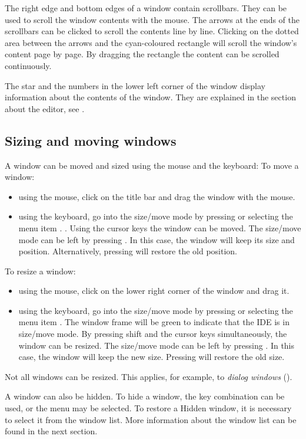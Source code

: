 The right edge and bottom edges of a window contain scrollbars.
They can be used to scroll the window contents with the mouse. 
The arrows at the ends of the scrollbars can be clicked to scroll the 
contents line by line. Clicking on the dotted area between the arrows 
and the cyan-coloured rectangle will scroll the window's content 
page by page. By dragging the rectangle the content can be scrolled 
continuously.

The star and the numbers in the lower left corner of the window
display information about the contents of the window. They
are explained in the section about the editor, see .

%
%
\subsection{Sizing and moving windows}
\label{se:windowsizingmoving}
A window can be moved and sized using the mouse and the keyboard:
To move a window:
\begin{itemize}
\item using the mouse, click on the title bar and drag the window 
with the mouse.
\item using the keyboard, go into the size/move mode
by pressing  or selecting the menu item
. . Using the cursor keys the window can be moved. 
The size/move mode can be left by pressing . 
In this case, the window will keep its size and position. 
Alternatively, pressing  will restore the old position.
\end{itemize} 
To resize a window:
\begin{itemize}
\item using the mouse, click on the lower right corner of the window
and drag it.
\item using the keyboard, go into the size/move mode
by pressing  or selecting the menu item
. The window frame will be green to indicate that
the IDE is in size/move mode. 
By pressing shift and the cursor keys simultaneously, the window can 
be resized.  The size/move mode can be left by pressing
. In this case, the window will keep the new size.
Pressing  will restore the old size.
\end{itemize}
Not all windows can be resized. This applies, for example, to
\emph{dialog windows} ().

A window can also be hidden. To hide a window, the  key
combination can be used, or the  menu may be selected.
To restore a Hidden window, it is necessary to select it from the window
list. More information about the window list can be found in the next
section.   
%
%

